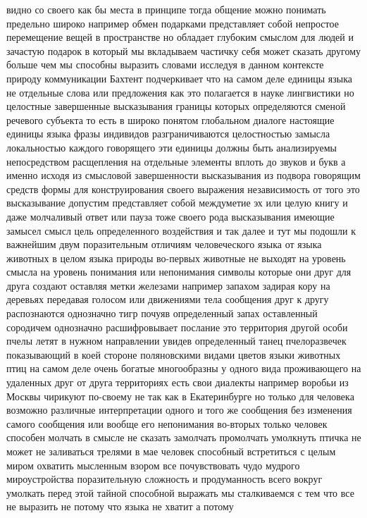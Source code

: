 видно со своего как бы места в принципе тогда общение можно понимать предельно
широко например обмен подарками представляет собой непростое перемещение вещей в
пространстве но обладает глубоким смыслом для людей и зачастую подарок в который
мы вкладываем частичку себя может сказать другому больше чем мы способны
выразить словами исследуя в данном контексте природу коммуникации Бахтент
подчеркивает что на самом деле единицы языка не отдельные слова или предложения
как это полагается в науке лингвистики но целостные завершенные высказывания
границы которых определяются сменой речевого субъекта то есть в широко понятом
глобальном диалоге настоящие единицы языка фразы индивидов разграничиваются
целостностью замысла локальностью каждого говорящего эти единицы должны быть
анализируемы непосредством расщепления на отдельные элементы вплоть до звуков и
букв а именно исходя из смысловой завершенности высказывания из подвора
говорящим средств формы для конструирования своего выражения независимость от
того это высказывание допустим представляет собой междуметие эх или целую книгу
и даже молчаливый ответ или пауза тоже своего рода высказывания имеющие замысел
смысл цель определенного воздействия и так далее и тут мы подошли к важнейшим
двум поразительным отличиям человеческого языка от языка животных в целом языка
природы во-первых животные не выходят на уровень смысла на уровень понимания или
непонимания символы которые они друг для друга создают оставляя метки железами
например запахом задирая кору на деревьях передавая голосом или движениями тела
сообщения друг к другу распознаются однозначно тигр почуяв определенный запах
оставленный сородичем однозначно расшифровывает послание это территория другой
особи пчелы летят в нужном направлении увидев определенный танец пчелоразвечек
показывающий в коей стороне поляновскими видами цветов языки животных птиц на
самом деле очень богатые многообразны у одного вида проживающего на удаленных
друг от друга территориях есть свои диалекты например воробьи из Москвы чирикуют
по-своему не так как в Екатеринбурге но только для человека возможно различные
интерпретации одного и того же сообщения без изменения самого сообщения или
вообще его непонимания во-вторых только человек способен молчать в смысле не
сказать замолчать промолчать умолкнуть птичка не может не заливаться трелями в
мае человек способный встретиться с целым миром охватить мысленным взором все
почувствовать чудо мудрого мироустройства поразительную сложность и
продуманность всего вокруг умолкать перед этой тайной способной выражать мы
сталкиваемся с тем что все не выразить не потому что языка не хватит а потому

